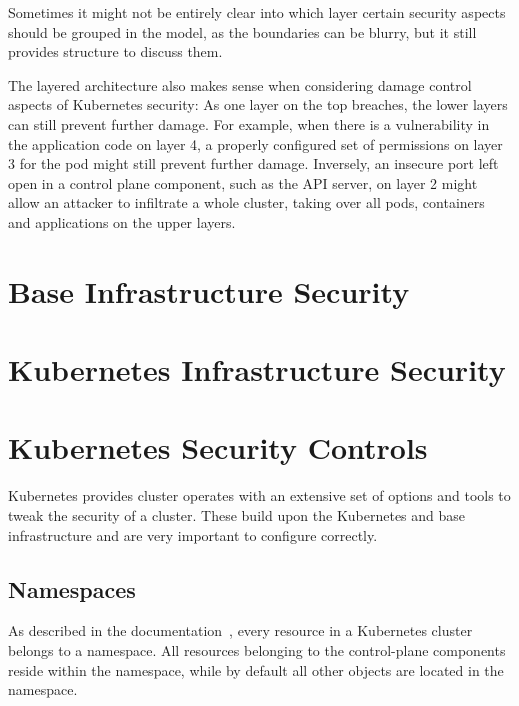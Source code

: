 Sometimes it might not be entirely clear into which layer certain security aspects should be grouped in the model, as the boundaries can be blurry, but it still provides structure to discuss them.

The layered architecture also makes sense when considering damage control aspects of Kubernetes security: As one layer on the top breaches, the lower layers can still prevent further damage. For example, when there is a vulnerability in the application code on layer 4, a properly configured set of permissions on layer 3 for the pod might still prevent further damage. Inversely, an insecure port left open in a control plane component, such as the API server, on layer 2 might allow an attacker to infiltrate a whole cluster, taking over all pods, containers and applications on the upper layers. 
	
\section{Base Infrastructure Security} \label{sec:layer1}


\section{Kubernetes Infrastructure Security} \label{sec:layer2}



\section{Kubernetes Security Controls} \label{sec:layer3}

Kubernetes provides cluster operates with an extensive set of options and tools to tweak the security of a cluster. These build upon the Kubernetes and base infrastructure and are very important to configure correctly. 


\subsection{Namespaces} \label{sec:namespaces}

As described in the documentation~\textcite{k8sdocs}, every resource in a Kubernetes cluster belongs to a namespace. All resources belonging to the control-plane components reside within the  namespace, while by default all other objects are located in the  namespace. 

